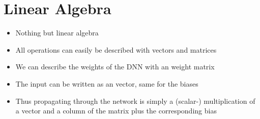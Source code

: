 \documentclass[t]{beamer}
\begin{document}
\section{Linear Algebra}
\begin{frame}
    \begin{itemize}
        \item Nothing but linear algebra
        \item All operations can easily be described with vectors and matrices \\
        \item We can describe the weights of the DNN with an weight matrix
        \item The input can be written as an vector, same for the biases
        \item Thus propagating through the network is simply a (scalar-) multiplication of a vector and a column of the matrix plus the corresponding bias
    \end{itemize}
\end{frame}
\end{document}
